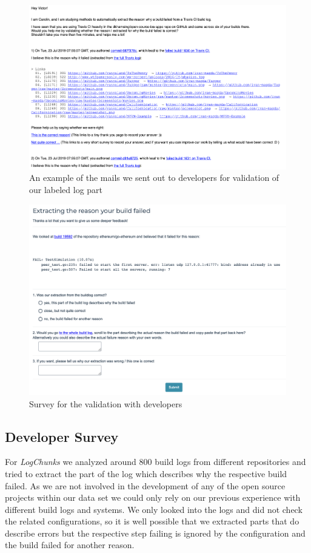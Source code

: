 \documentclass[\myrootdir/main.tex]{subfiles}
\begin{document}
\begin{figure}[h]
	\centering
	\includegraphics[width=\textwidth, clip]{img/dev-mail.png}
	\caption{An example of the mails we sent out to developers for validation of our labeled log part}
	\label{fig:dev-mail}
\end{figure}
\begin{figure}[h]
	\centering
	\includegraphics[width=\textwidth, clip]{img/dev-survey.png}
	\caption{Survey for the validation with developers}
	\label{fig:dev-survey}
\end{figure}

\subsection{Developer Survey}

For \emph{LogChunks} we analyzed around 800 build logs from different repositories and tried to extract the part of the log which describes why the respective build failed.
As we are not involved in the development of any of the open source projects within our data set we could only rely on our previous experience with different build logs and systems.
We only looked into the logs and did not check the related configurations, so it is well possible that we extracted parts that do describe errors but the respective step failing is ignored by the configuration and the build failed for another reason.
\end{document}

